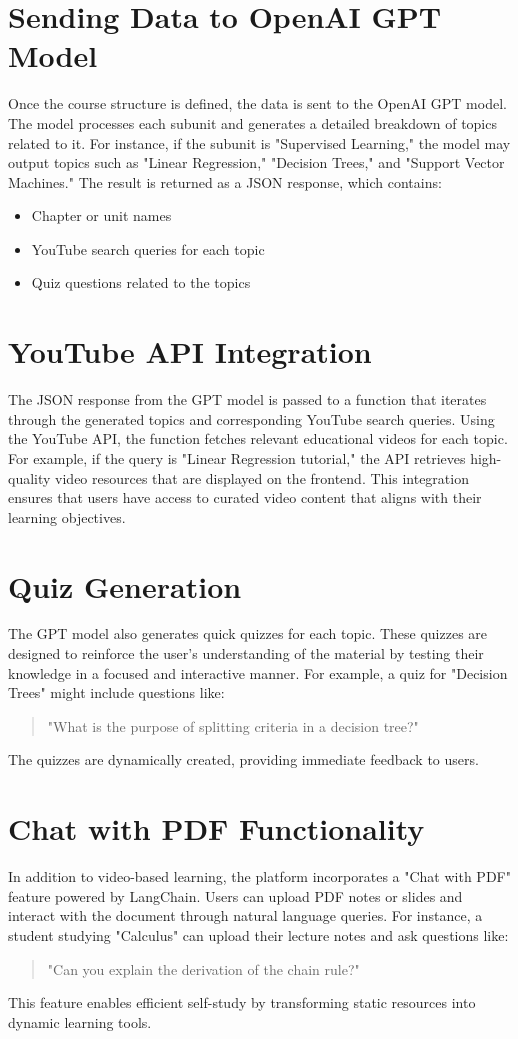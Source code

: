 \section{Sending Data to OpenAI GPT Model}
Once the course structure is defined, the data is sent to the OpenAI GPT model. The model processes each subunit and generates a detailed breakdown of topics related to it. For instance, if the subunit is "Supervised Learning," the model may output topics such as "Linear Regression," "Decision Trees," and "Support Vector Machines." The result is returned as a JSON response, which contains:
\begin{itemize}
    \item Chapter or unit names
    \item YouTube search queries for each topic
    \item Quiz questions related to the topics
\end{itemize}

\section{YouTube API Integration}
The JSON response from the GPT model is passed to a function that iterates through the generated topics and corresponding YouTube search queries. Using the YouTube API, the function fetches relevant educational videos for each topic. For example, if the query is "Linear Regression tutorial," the API retrieves high-quality video resources that are displayed on the frontend. This integration ensures that users have access to curated video content that aligns with their learning objectives.

\section{Quiz Generation}
The GPT model also generates quick quizzes for each topic. These quizzes are designed to reinforce the user's understanding of the material by testing their knowledge in a focused and interactive manner. For example, a quiz for "Decision Trees" might include questions like:
\begin{quote}
    "What is the purpose of splitting criteria in a decision tree?"
\end{quote}
The quizzes are dynamically created, providing immediate feedback to users.

\section{Chat with PDF Functionality}
In addition to video-based learning, the platform incorporates a "Chat with PDF" feature powered by LangChain. Users can upload PDF notes or slides and interact with the document through natural language queries. For instance, a student studying "Calculus" can upload their lecture notes and ask questions like:
\begin{quote}
    "Can you explain the derivation of the chain rule?"
\end{quote}
This feature enables efficient self-study by transforming static resources into dynamic learning tools.

